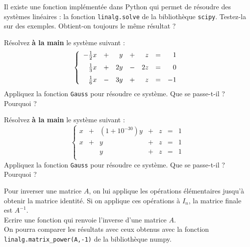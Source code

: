 \begin{exercice}
Il existe une fonction impl\' ement\' ee dans Python qui permet de r\' esoudre des syst\` emes lin\' eaires : la fonction \verb?linalg.solve? de la biblioth\` eque \verb?scipy?. Testez-la sur des exemples. Obtient-on toujours le m\^ eme r\' esultat ?
\end{exercice}






\begin{exercice}
Résolvez \textbf{à la main} le syst\` eme suivant :
\[\left\lbrace \begin{array}{rrrrrrrrrrrrrrrrrr}
-\frac{1}{2}x&+&y&+&z&=&1\medskip\\
\frac{1}{3}x&+&2y&-&2z&=&0\medskip\\
\frac{1}{6}x&-&3y&+&z&=&-1\\
\end{array}\right.\]
Appliquez la fonction \verb?Gauss? pour r\' esoudre ce syst\` eme. Que se passe-t-il ? Pourquoi ?
\end{exercice}




\begin{exercice}
Résolvez \textbf{à la main} le syst\` eme suivant :
\[\left\lbrace \begin{array}{rrrrrrrrrrrrrrrrrr}
x&+&(1+10^{-30})y&+&z&=&1\\
x&+&y&+&z&=&1\\
&&y&+&z&=&1\\
\end{array}\right.\]
Appliquez la fonction \verb?Gauss? pour r\' esoudre ce syst\` eme. Que se passe-t-il ? Pourquoi ?
\end{exercice}






\begin{exercice}
Pour inverser une matrice $A$, on lui applique les op\' erations \' el\' ementaires jusqu'\` a obtenir la matrice identit\' e. Si on applique ces op\' erations \` a $I_n$, la matrice finale est $A^{-1}$.\\
Ecrire une fonction qui renvoie l'inverse d'une matrice $A$.\\
On pourra comparer les r\' esultats avec ceux obtenus avec la fonction \verb?linalg.matrix_power(A,-1)? de la biblioth\` eque numpy.
\end{exercice}



